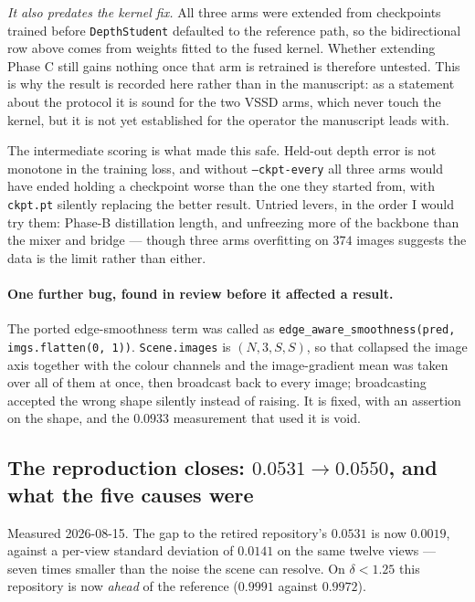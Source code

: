 \documentclass[11pt,a4paper]{article}
\begin{document}
\emph{It also predates the kernel fix.} All three arms were extended from checkpoints trained
before \texttt{DepthStudent} defaulted to the reference path, so the bidirectional row above comes
from weights fitted to the fused kernel. Whether extending Phase C still gains nothing once that
arm is retrained is therefore untested. This is why the result is recorded here rather than in the
manuscript: as a statement about the protocol it is sound for the two VSSD arms, which never touch
the kernel, but it is not yet established for the operator the manuscript leads with.

The intermediate scoring is what made this safe. Held-out depth error is not monotone in the
training loss, and without \texttt{--ckpt-every} all three arms would have ended holding a
checkpoint worse than the one they started from, with \texttt{ckpt.pt} silently replacing the
better result. Untried levers, in the order I would try them: Phase-B distillation length, and
unfreezing more of the backbone than the mixer and bridge --- though three arms overfitting on
$374$ images suggests the data is the limit rather than either.

\paragraph{One further bug, found in review before it affected a result.} The ported
edge-smoothness term was called as \texttt{edge\_aware\_smoothness(pred, imgs.flatten(0, 1))}.
\texttt{Scene.images} is $(N,3,S,S)$, so that collapsed the image axis together with the colour
channels and the image-gradient mean was taken over all of them at once, then broadcast back to
every image; broadcasting accepted the wrong shape silently instead of raising. It is fixed, with
an assertion on the shape, and the $0.0933$ measurement that used it is void.

\subsection{The reproduction closes: $0.0531 \to 0.0550$, and what the five causes were}
\label{sec:eth3d-repro-closed}

Measured 2026-08-15. The gap to the retired repository's $0.0531$ is now $0.0019$, against a
per-view standard deviation of $0.0141$ on the same twelve views --- seven times smaller than the
noise the scene can resolve. On $\delta{<}1.25$ this repository is now \emph{ahead} of the
reference ($0.9991$ against $0.9972$).
\end{document}
